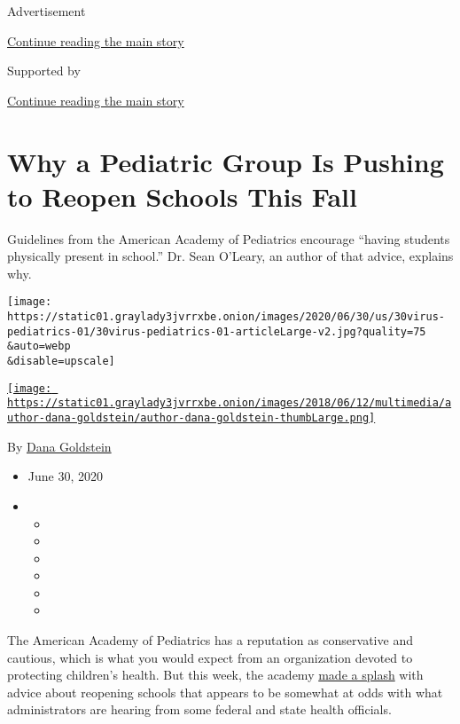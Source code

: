 Advertisement

\protect\hyperlink{after-top}{Continue reading the main story}

Supported by

\protect\hyperlink{after-sponsor}{Continue reading the main story}

\hypertarget{why-a-pediatric-group-is-pushing-to-reopen-schools-this-fall}{%
\section{Why a Pediatric Group Is Pushing to Reopen Schools This
Fall}\label{why-a-pediatric-group-is-pushing-to-reopen-schools-this-fall}}

Guidelines from the American Academy of Pediatrics encourage ``having
students physically present in school.'' Dr. Sean O'Leary, an author of
that advice, explains why.

\texttt{[image: https://static01.graylady3jvrrxbe.onion/images/2020/06/30/us/30virus-pediatrics-01/30virus-pediatrics-01-articleLarge-v2.jpg?quality=75\\\&auto=webp\\\&disable=upscale]}

\href{https://www.nytimes3xbfgragh.onion/by/dana-goldstein}{\texttt{[image: https://static01.graylady3jvrrxbe.onion/images/2018/06/12/multimedia/author-dana-goldstein/author-dana-goldstein-thumbLarge.png]}}

By \href{https://www.nytimes3xbfgragh.onion/by/dana-goldstein}{Dana
Goldstein}

\begin{itemize}
\item
  June 30, 2020
\item
  \begin{itemize}
  \item
  \item
  \item
  \item
  \item
  \item
  \end{itemize}
\end{itemize}

The American Academy of Pediatrics has a reputation as conservative and
cautious, which is what you would expect from an organization devoted to
protecting children's health. But this week, the academy
\href{https://twitter.com/DanaGoldstein/status/1277566240526123008}{made
a splash} with advice about reopening schools that appears to be
somewhat at odds with what administrators are hearing from some federal
and state health officials.

